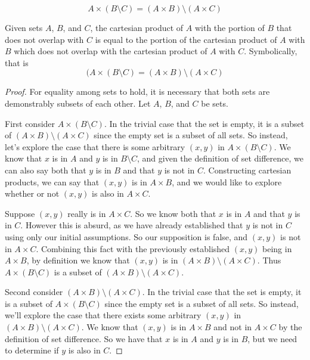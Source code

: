 \documentclass[main.tex]{subfiles}
\begin{document}
\subproblem{}\label{2o}
\[A \times (B \setminus C) = (A \times B) \setminus (A \times C)\]
\begin{thm}
	Given sets \(A\), \(B\), and \(C\), the cartesian product of \(A\) with
	the portion of \(B\) that does not overlap with \(C\) is equal to the
	portion of the cartesian product of \(A\) with \(B\) which does not
	overlap with the cartesian product of \(A\) with \(C\). Symbolically,
	that is
	\[(A \times (B \setminus C) = (A \times B) \setminus (A \times C)\]
\end{thm}
\begin{proof}
	For equality among sets to hold, it is necessary that both sets are
	demonstrably subsets of each other. Let \(A\), \(B\), and \(C\) be sets.

	\medskip
	First consider \(A \times (B \setminus C)\). In the trivial case that
	the set is empty, it is a subset of
	\((A \times B) \setminus (A \times C)\) since the empty set is a subset
	of all sets. So instead, let's explore the case that there is some
	arbitrary \((x,y)\) in \(A \times (B \setminus C)\). We know that \(x\)
	is in \(A\) and \(y\) is in \(B \setminus C\), and given the definition
	of set difference, we can also say both that \(y\) is in \(B\) and that
	\(y\) is not in \(C\). Constructing cartesian products, we can say that
	\((x,y)\) is in \(A \times B\), and we would like to explore whether or
	not \((x,y)\) is also in \(A \times C\).

	Suppose \((x,y)\) really is in \(A \times C\). So we know both that
	\(x\) is in \(A\) and that \(y\) is in \(C\). However this is absurd, as
	we have already established that \(y\) is not in \(C\) using only our
	initial assumptions. So our supposition is false, and \((x,y)\) is not
	in \(A \times C\). Combining this fact with the previously established
	\((x,y)\) being in \(A \times B\), by definition we know that \((x,y)\)
	is in \((A \times B) \setminus (A \times C)\). Thus
	\(A \times (B \setminus C)\) is a subset of
	\((A \times B) \setminus (A \times C)\).

	\medskip
	Second consider \((A \times B) \setminus (A \times C)\). In the trivial
	case that the set is empty, it is a subset of
	\(A \times (B \setminus C)\) since the empty set is a subset of all
	sets. So instead, we'll explore the case that there exists some
	arbitrary \((x,y)\) in \((A \times B) \setminus (A \times C)\). We know
	that \((x,y)\) is in \(A \times B\) and not in \(A \times C\) by the
	definition of set difference. So we have that \(x\) is in \(A\) and
	\(y\) is in \(B\), but we need to determine if \(y\) is also in \(C\).


\end{proof}
\end{document}
